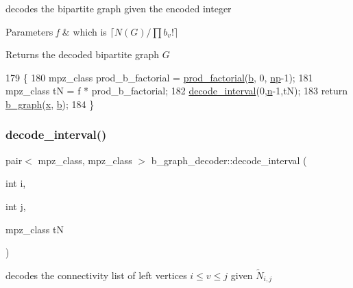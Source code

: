 decodes the bipartite graph given the encoded integer 


\begin{DoxyParams}{Parameters}
{\em f} & which is $\lceil N(G) / \prod b_v! \rceil$ \\
\hline
\end{DoxyParams}
\begin{DoxyReturn}{Returns}
the decoded bipartite graph $G$ 
\end{DoxyReturn}

\begin{DoxyCode}
179 \{
180   mpz\_class prod\_b\_factorial = \hyperlink{compression__helper_8cpp_a86d8a20e022dc06b23df3b08ac10b7d1}{prod\_factorial}(\hyperlink{classb__graph__decoder_a12d1a4a91f342111d2116196cb826317}{b}, 0, \hyperlink{classb__graph__decoder_a7eca48cf8793e722d1b29dbdc9fd2dca}{np}-1);
181   mpz\_class tN = f * prod\_b\_factorial;
182   \hyperlink{classb__graph__decoder_ae8b20698e015819cbdb8da7997888fd8}{decode\_interval}(0,\hyperlink{classb__graph__decoder_a2caddd63df6808c95e2ee738f7c77870}{n}-1,tN);
183   \textcolor{keywordflow}{return} \hyperlink{classb__graph}{b\_graph}(\hyperlink{classb__graph__decoder_a6bba2e67984f9733fc60c40dd4956587}{x}, \hyperlink{classb__graph__decoder_a12d1a4a91f342111d2116196cb826317}{b});
184 \}
\end{DoxyCode}
\mbox{\label{classb__graph__decoder_ae8b20698e015819cbdb8da7997888fd8}} 
\subsubsection{\texorpdfstring{decode\+\_\+interval()}{decode\_interval()}}
{\footnotesize\ttfamily pair$<$ mpz\+\_\+class, mpz\+\_\+class $>$ b\+\_\+graph\+\_\+decoder\+::decode\+\_\+interval (\begin{DoxyParamCaption}\item[{int}]{i,  }\item[{int}]{j,  }\item[{mpz\+\_\+class}]{tN }\end{DoxyParamCaption})}



decodes the connectivity list of left vertices $i \leq v \leq j$ given $\tilde{N}_{i,j}$ 


